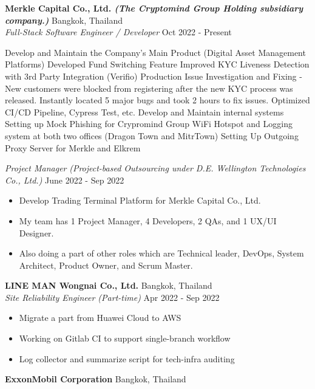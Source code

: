 \textbf{Merkle Capital Co., Ltd. \textit{\tiny{(The Cryptomind Group Holding subsidiary company.)}}} \hfill Bangkok, Thailand\\
\textit{Full-Stack Software Engineer / Developer} \hfill Oct 2022 - Present\\
\vspace{-1mm}
\begin{outline}
	\1 Develop and Maintain the Company's Main Product (Digital Asset Management Platforms)
		\2 Developed Fund Switching Feature
		\2 Improved KYC Liveness Detection with 3rd Party Integration (Verifio)
		\2 Production Issue Investigation and Fixing - New customers were blocked from registering after the new KYC process was released. Instantly located 5 major bugs and took 2 hours to fix issues.
		\2 Optimized CI/CD Pipeline, Cypress Test, etc.
	\1 Develop and Maintain internal systems
		\2 Setting up Mock Phishing for Crypromind Group
		\2 WiFi Hotspot and Logging system at both two offices (Dragon Town and MitrTown)
		\2 Setting Up Outgoing Proxy Server for Merkle and Elkrem
\end{outline}
\textit{Project Manager} \textit{\tiny (Project-based Outsourcing under D.E. Wellington Technologies Co., Ltd.)} \hfill June 2022 - Sep 2022\\
\vspace{-1mm}
\begin{itemize}
	\item Develop Trading Terminal Platform for Merkle Capital Co., Ltd.
	\item My team has 1 Project Manager, 4 Developers, 2 QAs, and 1 UX/UI Designer.
	\item Also doing a part of other roles which are Technical leader, DevOps, System Architect, Product Owner, and Scrum Master.
\end{itemize}
\textbf{LINE MAN Wongnai Co., Ltd.} \hfill Bangkok, Thailand\\
\textit{Site Reliability Engineer (Part-time)} \hfill Apr 2022 - Sep 2022\\
\vspace{-1mm}
\begin{itemize}
	\item Migrate a part from Huawei Cloud to AWS
	\item Working on Gitlab CI to support single-branch workflow
	\item Log collector and summarize script for tech-infra auditing
\end{itemize}
\textbf{ExxonMobil Corporation} \hfill Bangkok, Thailand\\
